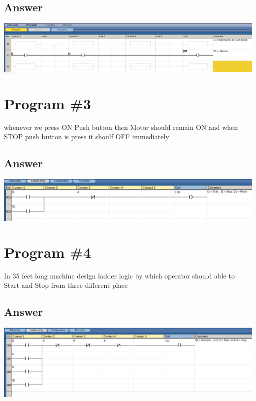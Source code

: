 \documentclass[
	12pt, %
]{fphw}
\begin{document}
\subsection*{Answer}
 \begin{center}
  \includegraphics[width=165mm, scale=0.80]{prg2.png}
 \end{center}
\section*{Program \#3}

 \begin{problem}
  whenever we press ON Push button then Motor should remain ON and when STOP
 push button is press it shoulf OFF immediately
 \end{problem}

\subsection*{Answer}
 \begin{center}
  \includegraphics[width=165mm, scale=0.80]{prg3.png}
 \end{center}
\section*{Program \#4}
 \begin{problem}
  In 35 feet long machine design ladder logic by which operator should able to
  Start and Stop from three different place 
 \end{problem}

\subsection*{Answer}
 \begin{center}
 \includegraphics[width=165mm, scale=0.80]{prg4.png}
 \end{center}
\end{document}
